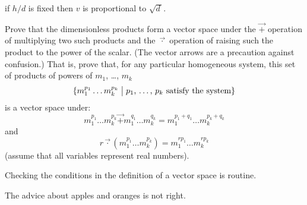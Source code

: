 \begin{exercises}
\begin{answer}
\begin{exparts}
              if $h/d$ is fixed then $v$ is proportional to $\sqrt{d\,}$.
          \end{exparts}
        \end{answer}
   \item \label{exer:DimLessProdsVecSp}
      Prove that the dimensionless products form a vector space
      under the $\vec{+}$ operation of multiplying two such products 
      and the $\vec{\cdot}$ operation of raising 
      such the product to the power of the scalar.
      (The vector arrows are a precaution against confusion.)
      That is, prove that, for any particular homogeneous system,
      this set of products of powers of $m_1$, \ldots, $m_k$
      \begin{equation*}
        \mbox{$\{m_1^{p_1}\dots m_k^{p_k}
             \bigm| 
              \text{$p_1$, \ldots, $p_k$ satisfy the system}\}$}
      \end{equation*}
      is a vector space under:
      \begin{equation*}
        m_1^{p_1}\dots m_k^{p_k}
        \vec{+}
        m_1^{q_1}\dots m_k^{q_k}
        =
        m_1^{p_1+q_1}\dots m_k^{p_k+q_k}
      \end{equation*}
      and
      \begin{equation*}
        r\vec{\cdot} (m_1^{p_1}\dots m_k^{p_k})
        =
        m_1^{rp_1}\dots m_k^{rp_k}
      \end{equation*}
      (assume that all variables represent real numbers).
      \begin{answer}
        Checking the conditions in the definition of a vector space is 
        routine.
      \end{answer}
  \item \label{exer:AppsAndOranges}
    The advice about apples and oranges is not right.

\end{exercises}
